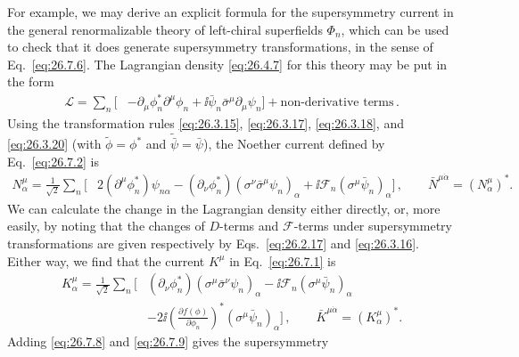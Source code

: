 For example, we may derive an explicit formula for the supersymmetry current
in the general renormalizable theory of left-chiral superfields \(\Phi_n\),
which can be used to check that it does generate supersymmetry
transformations, in the sense of Eq.~\eqref{eq:26.7.6}. The Lagrangian
density \eqref{eq:26.4.7} for this theory may be put in the form
\begin{equation}
  \begin{aligned}
  \mathcal{L}
  =\sum_n\biggl[
   &-\partial_\mu\phi_n^*\partial^\mu\phi_n
   +\ii\bar\psi_n\bar\sigma^\mu\partial_\mu\psi_n
  \biggr]
  +\text{non-derivative terms}\,.
  \end{aligned}
  \tag{26.7.7}\label{eq:26.7.7}
\end{equation}
Using the transformation rules \eqref{eq:26.3.15}, \eqref{eq:26.3.17},
\eqref{eq:26.3.18}, and \eqref{eq:26.3.20} (with
\(\widetilde{\phi}=\phi^*\) and
\(\widetilde{\bar\psi}=\bar\psi\)), the Noether current defined by
Eq.~\eqref{eq:26.7.2} is
\begin{equation}
  \begin{aligned}
  N^\mu_\alpha=\frac{1}{\sqrt{2}}\sum_n\bigl[
   &2(\partial^\mu\phi_n^*)\psi_{n\alpha}
    -(\partial_\nu\phi_n^*)
      (\sigma^\nu\bar\sigma^\mu\psi_n)_\alpha
    +\ii\mathcal{F}_n(\sigma^\mu\bar\psi_n)_\alpha
  \bigr]\,,
  \qquad
  \bar N^{\mu\dot\alpha}=(N^\mu_\alpha)^* .
  \end{aligned}
  \tag{26.7.8}\label{eq:26.7.8}
\end{equation}
We can calculate the change in the Lagrangian density either directly, or,
more easily, by noting that the changes of \(D\)-terms and
\(\mathcal{F}\)-terms under supersymmetry transformations are given
respectively by Eqs.~\eqref{eq:26.2.17} and \eqref{eq:26.3.16}. Either way,
we find that the current \(K^\mu\) in Eq.~\eqref{eq:26.7.1} is
\begin{equation}
  \begin{aligned}
  K^\mu_\alpha=\frac{1}{\sqrt{2}}\sum_n\biggl[
   &(\partial_\nu\phi_n^*)
      (\sigma^\mu\bar\sigma^\nu\psi_n)_\alpha
    -\ii\mathcal{F}_n(\sigma^\mu\bar\psi_n)_\alpha
  \\
   &-2\ii\left(\frac{\partial f(\phi)}{\partial\phi_n}\right)^*
      (\sigma^\mu\bar\psi_n)_\alpha
  \biggr]\,,
  \qquad
  \bar K^{\mu\dot\alpha}=(K^\mu_\alpha)^* .
  \end{aligned}
  \tag{26.7.9}\label{eq:26.7.9}
\end{equation}
Adding \eqref{eq:26.7.8} and \eqref{eq:26.7.9} gives the supersymmetry
